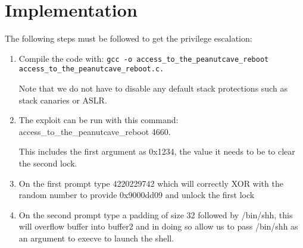 \section{Implementation}
\label{sec:implementation}
The following steps must be followed to get the privilege escalation:
\begin{enumerate}
\item Compile the code with: {\tt gcc -o access\_to\_the\_peanutcave\_reboot access\_to\_the\_peanutcave\_reboot.c.} 

Note that we do not have to disable any default stack protections such as stack canaries or ASLR.
\item The exploit can be run with this command: access\_to\_the\_peanutcave\_reboot 4660.

This includes the first argument as 0x1234, the value it needs to be to clear the second lock.
\item On the first prompt type 4220229742 which will correctly XOR with the random number to provide 0x9000dd09 and unlock the first lock
\item On the second prompt type a padding of size 32 followed by /bin/shh, this will overflow buffer into buffer2 and in doing so allow us to pass /bin/shh as an argument to execve to launch the shell.
\end{enumerate}
